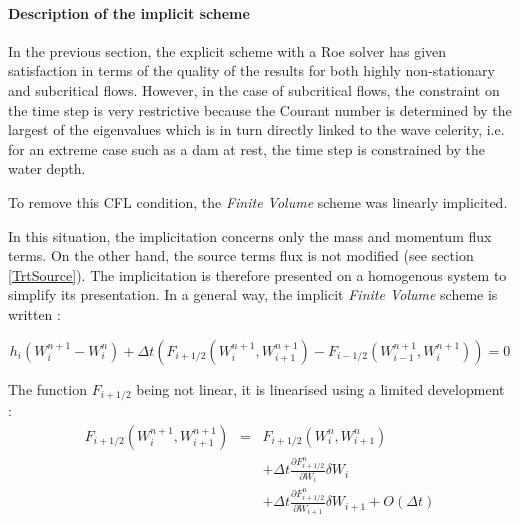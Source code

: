 \paragraph{Description of the implicit scheme\\}

\hspace*{1cm}

In the previous section, the explicit scheme with a Roe solver has given satisfaction in terms of the quality of the results for both highly non-\linebreak stationary and subcritical flows. However, in the case of subcritical flows, the constraint on the time step is very restrictive because the Courant number is determined by the largest of the eigenvalues which is in turn directly linked to the wave celerity, i.e. for an extreme case such as a dam at rest, the time step is constrained by the water depth.

\vspace{0.5cm}

To remove this CFL condition, the \textit{Finite Volume} scheme was linearly implicited.

\vspace{0.5cm}

In this situation, the implicitation concerns only the mass and momentum flux terms. On the other hand, the source terms flux is not modified (see section \ref{TrtSource}). The implicitation is therefore presented on a homogenous system to simplify its presentation. In a general way, the implicit \textit{Finite Volume} scheme is written :

\begin{equation}
 h_i (W_{i}^{n+1}-W_{i}^n) + \Delta t \left ( F_{i+1/2}(W_{i}^{n+1},W_{i+1}^{n+1})-F_{i-1/2}(W_{i-1}^{n+1},W_{i}^{n+1}) \right ) = 0
\end{equation}

\vspace{0.5cm}

The function $F_{i+1/2}$ being not linear, it is linearised using a limited development :
\begin{eqnarray}
 F_{i+1/2}(W_{i}^{n+1},W_{i+1}^{n+1}) & = & F_{i+1/2}(W_{i}^{n},W_{i+1}^{n}) \nonumber \\
                                      &   & + \Delta t \frac{\partial F_{i+1/2}^n}{\partial W_i} \delta W_i \nonumber \\
                                      &   & + \Delta t \frac{\partial F_{i+1/2}^n}{\partial W_{i+1}}\delta W_{i+1} + O(\Delta t)
\end{eqnarray}


